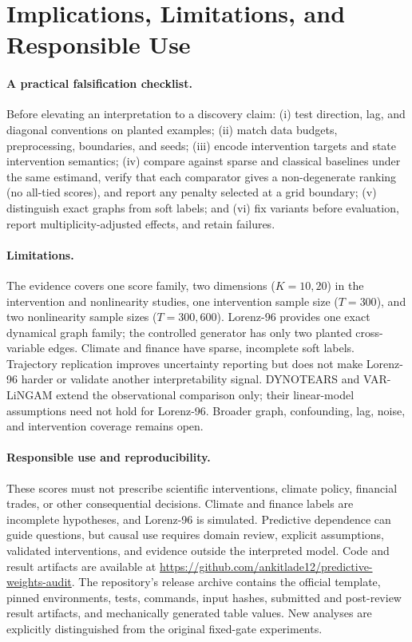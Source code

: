 \section{Implications, Limitations, and Responsible Use}
\label{sec:implications}

\paragraph{A practical falsification checklist.}
Before elevating an interpretation to a discovery claim: (i) test direction,
lag, and diagonal conventions on planted examples; (ii) match data budgets,
preprocessing, boundaries, and seeds; (iii) encode intervention targets and
state intervention semantics; (iv) compare against sparse and classical
baselines under the same estimand, verify that each comparator gives a
non-degenerate ranking (no all-tied scores), and report any penalty selected
at a grid boundary; (v) distinguish exact graphs from soft
labels; and (vi) fix variants before evaluation, report multiplicity-adjusted
effects, and retain failures.

\paragraph{Limitations.}
The evidence covers one score family, two dimensions ($K=10,20$) in the
intervention and nonlinearity studies, one intervention sample size ($T=300$),
and two nonlinearity sample sizes ($T=300,600$). Lorenz-96 provides one
exact dynamical graph family; the controlled generator has only two planted
cross-variable edges. Climate and finance have sparse, incomplete soft
labels. Trajectory replication improves uncertainty reporting but does not
make Lorenz-96 harder or validate another interpretability signal. DYNOTEARS
and VAR-LiNGAM extend the observational comparison only; their linear-model
assumptions need not hold for Lorenz-96. Broader graph, confounding, lag,
noise, and intervention coverage remains open.

\paragraph{Responsible use and reproducibility.}
These scores must not
prescribe scientific interventions, climate policy, financial trades, or
other consequential decisions. Climate and finance labels are incomplete
hypotheses, and Lorenz-96 is simulated. Predictive dependence can guide
questions, but causal use requires domain review, explicit assumptions,
validated interventions, and evidence outside the interpreted model.
Code and result artifacts are available at
\url{https://github.com/ankitlade12/predictive-weights-audit}.
The repository's release archive contains the official template,
pinned environments, tests, commands, input hashes, submitted and post-review
result artifacts, and mechanically generated table values. New analyses are
explicitly distinguished from the original fixed-gate experiments.

